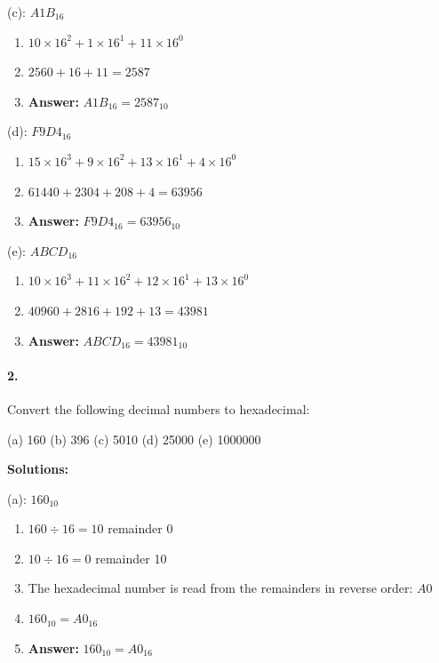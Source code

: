 \documentclass{article}
\begin{document}
\vspace*{0.5cm}

\noindent (c): $A1B_{16}$

\begin{enumerate}
    \item $10 \times 16^2 + 1 \times 16^1 + 11 \times 16^0$
    \item $2560 + 16 + 11 = 2587$
    \item \textbf{Answer:} $A1B_{16} = 2587_{10}$
\end{enumerate}

\vspace*{0.5cm}

\noindent (d): $F9D4_{16}$

\begin{enumerate}
    \item $15 \times 16^3 + 9 \times 16^2 + 13 \times 16^1 + 4 \times 16^0$
    \item $61440 + 2304 + 208 + 4 = 63956$
    \item \textbf{Answer:} $F9D4_{16} = 63956_{10}$
\end{enumerate}

\vspace*{0.5cm}

\noindent (e): $ABCD_{16}$

\begin{enumerate}
    \item $10 \times 16^3 + 11 \times 16^2 + 12 \times 16^1 + 13 \times 16^0$
    \item $40960 + 2816 + 192 + 13 = 43981$
    \item \textbf{Answer:} $ABCD_{16} = 43981_{10}$
\end{enumerate}

\newpage

\paragraph*{2.}

Convert the following decimal numbers to hexadecimal:

(a) 160 (b) 396 (c) 5010 (d) 25000 (e) 1000000

\vspace*{0.5cm}

\noindent \textbf{Solutions:}

\vspace*{0.25cm}

\noindent (a): $160_{10}$

\begin{enumerate}
    \item $160 \div 16 = 10$ remainder 0
    \item $10 \div 16 = 0$ remainder 10
    \item The hexadecimal number is read from the remainders in reverse order: $A0$
    \item $160_{10} = A0_{16}$
    \item \textbf{Answer:} $160_{10} = A0_{16}$
\end{enumerate}
\end{document}
